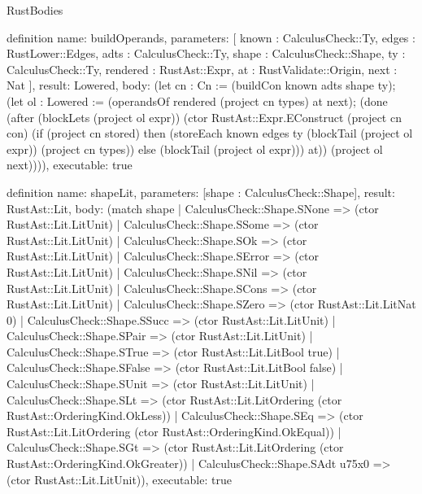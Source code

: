 \begin{lexlean}{RustBodies}
\begin{semanticmodule}
definition{
  name: buildOperands,
  parameters: [
    known : CalculusCheck::Ty,
    edges : RustLower::Edges,
    adts : CalculusCheck::Ty,
    shape : CalculusCheck::Shape,
    ty : CalculusCheck::Ty,
    rendered : RustAst::Expr,
    at : RustValidate::Origin,
    next : Nat
  ],
  result: Lowered,
  body: (let cn : Cn := (buildCon known adts shape ty); (let ol : Lowered := (operandsOf rendered (project cn types) at next); (done (after (blockLets (project ol expr)) (ctor RustAst::Expr.EConstruct (project cn con) (if (project cn stored) then (storeEach known edges ty (blockTail (project ol expr)) (project cn types)) else (blockTail (project ol expr))) at)) (project ol next)))),
  executable: true
}

definition{
  name: shapeLit,
  parameters: [shape : CalculusCheck::Shape],
  result: RustAst::Lit,
  body: (match shape
    | CalculusCheck::Shape.SNone => (ctor RustAst::Lit.LitUnit)
    | CalculusCheck::Shape.SSome => (ctor RustAst::Lit.LitUnit)
    | CalculusCheck::Shape.SOk => (ctor RustAst::Lit.LitUnit)
    | CalculusCheck::Shape.SError => (ctor RustAst::Lit.LitUnit)
    | CalculusCheck::Shape.SNil => (ctor RustAst::Lit.LitUnit)
    | CalculusCheck::Shape.SCons => (ctor RustAst::Lit.LitUnit)
    | CalculusCheck::Shape.SZero => (ctor RustAst::Lit.LitNat 0)
    | CalculusCheck::Shape.SSucc => (ctor RustAst::Lit.LitUnit)
    | CalculusCheck::Shape.SPair => (ctor RustAst::Lit.LitUnit)
    | CalculusCheck::Shape.STrue => (ctor RustAst::Lit.LitBool true)
    | CalculusCheck::Shape.SFalse => (ctor RustAst::Lit.LitBool false)
    | CalculusCheck::Shape.SUnit => (ctor RustAst::Lit.LitUnit)
    | CalculusCheck::Shape.SLt => (ctor RustAst::Lit.LitOrdering (ctor RustAst::OrderingKind.OkLess))
    | CalculusCheck::Shape.SEq => (ctor RustAst::Lit.LitOrdering (ctor RustAst::OrderingKind.OkEqual))
    | CalculusCheck::Shape.SGt => (ctor RustAst::Lit.LitOrdering (ctor RustAst::OrderingKind.OkGreater))
    | CalculusCheck::Shape.SAdt u75x0 => (ctor RustAst::Lit.LitUnit)),
  executable: true
}


\end{semanticmodule}
\end{lexlean}

